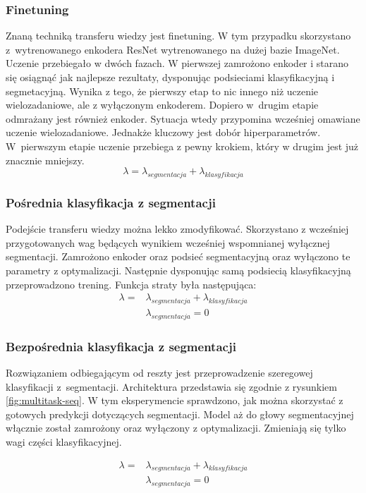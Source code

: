\subsubsection{Finetuning}
Znaną techniką transferu wiedzy jest finetuning. W tym przypadku skorzystano z~wytrenowanego enkodera ResNet wytrenowanego na dużej bazie ImageNet. Uczenie przebiegało w dwóch fazach. W pierwszej zamrożono enkoder i starano się osiągnąć jak najlepsze rezultaty, dysponując podsieciami klasyfikacyjną i segmetacyjną. Wynika z tego, że pierwszy etap to nic innego niż uczenie wielozadaniowe, ale z wyłączonym enkoderem. Dopiero w~drugim etapie odmrażany jest również enkoder. Sytuacja wtedy przypomina wcześniej omawiane uczenie wielozadaniowe. Jednakże kluczowy jest dobór hiperparametrów. W~pierwszym etapie uczenie przebiega z pewny krokiem, który w drugim jest już znacznie mniejszy.
\begin{equation*}
\lambda = \lambda_{segmentacja} + \lambda_{klasyfikacja}
\end{equation*}
\subsubsection{Pośrednia klasyfikacja z segmentacji}
Podejście transferu wiedzy można lekko zmodyfikować. Skorzystano z wcześniej przygotowanych wag będących wynikiem wcześniej wspomnianej wyłącznej segmentacji. Zamrożono enkoder oraz podsieć segmentacyjną oraz wyłączono te parametry z optymalizacji. Następnie dysponując samą podsiecią klasyfikacyjną przeprowadzono trening. Funkcja straty była następująca:
\begin{align*}
\lambda  = & \lambda_{segmentacja} + \lambda_{klasyfikacja} \\
           & \lambda_{segmentacja} = 0
\end{align*}
\subsubsection{Bezpośrednia klasyfikacja z segmentacji}
Rozwiązaniem odbiegającym od reszty jest przeprowadzenie szeregowej klasyfikacji z~segmentacji. Architektura przedstawia się zgodnie z rysunkiem \ref{fig:multitask-seq}. W tym eksperymencie sprawdzono, jak można skorzystać z gotowych predykcji dotyczących segmentacji. Model aż do głowy segmentacyjnej włącznie został zamrożony oraz wyłączony z optymalizacji. Zmieniają się tylko wagi części klasyfikacyjnej.

\begin{align*}
\lambda  = & \lambda_{segmentacja} + \lambda_{klasyfikacja} \\
           & \lambda_{segmentacja} = 0
\end{align*}





